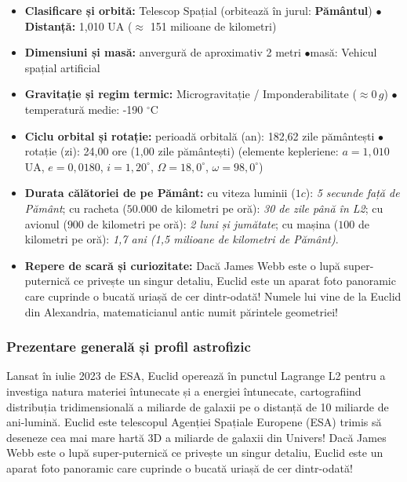 \begin{tcolorbox}[orbitardata, title={\textbf{Repere esențiale: Telescopul Spațial Euclid}}]
\small
\begin{itemize}[leftmargin=1.4em, itemsep=2pt, topsep=2pt]
  \item \textbf{Clasificare și orbită:} Telescop Spațial (orbitează în jurul: \textbf{Pământul}) \quad$\bullet$\quad \textbf{Distanță:} 1,010 UA ($\approx$ 151 milioane de kilometri)
  \item \textbf{Dimensiuni și masă:} anvergură de aproximativ 2 metri \quad$\bullet$\quad masă: Vehicul spațial artificial
  \item \textbf{Gravitație și regim termic:} Microgravitație / Imponderabilitate ($\approx 0\,g$) \quad$\bullet$\quad temperatură medie: -190 $^\circ$C
  \item \textbf{Ciclu orbital și rotație:} perioadă orbitală (an): 182,62 zile pământești \quad$\bullet$\quad rotație (zi): 24,00 ore (1,00 zile pământești) (elemente kepleriene: $a = 1,010$ UA, $e = 0,0180$, $i = 1,20^\circ$, $\Omega = 18,0^\circ$, $\omega = 98,0^\circ$)
  \item \textbf{Durata călătoriei de pe Pământ:} cu viteza luminii ($1c$): \emph{5 secunde față de Pământ}; cu racheta ($50.000$ de kilometri pe oră): \emph{30 de zile până în L2}; cu avionul ($900$ de kilometri pe oră): \emph{2 luni și jumătate}; cu mașina ($100$ de kilometri pe oră): \emph{1,7 ani (1,5 milioane de kilometri de Pământ)}.
  \item \textbf{Repere de scară și curiozitate:} Dacă James Webb este o lupă super-puternică ce privește un singur detaliu, Euclid este un aparat foto panoramic care cuprinde o bucată uriașă de cer dintr-odată! Numele lui vine de la Euclid din Alexandria, matematicianul antic numit \guillemotleft{}părintele geometriei\guillemotright{}!
\end{itemize}
\end{tcolorbox}

\subsubsection*{Prezentare generală și profil astrofizic}
Lansat în iulie 2023 de ESA, Euclid operează în punctul Lagrange L2 pentru a investiga natura materiei întunecate și a energiei întunecate, cartografiind distribuția tridimensională a miliarde de galaxii pe o distanță de 10 miliarde de ani-lumină. Euclid este telescopul Agenției Spațiale Europene (ESA) trimis să deseneze cea mai mare hartă 3D a miliarde de galaxii din Univers! Dacă James Webb este o lupă super-puternică ce privește un singur detaliu, Euclid este un aparat foto panoramic care cuprinde o bucată uriașă de cer dintr-odată!

